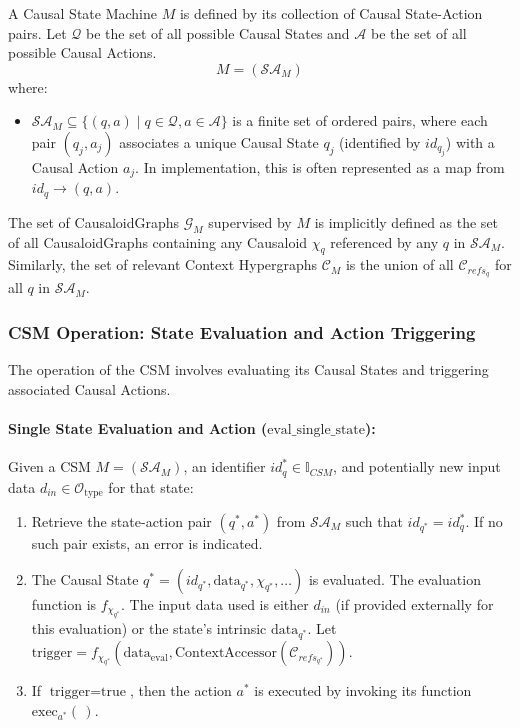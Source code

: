 \newpage

\begin{definition}
\label{def:csm_csm}  
A Causal State Machine \( M \) is defined by its collection of Causal State-Action pairs. Let \(\mathcal{Q}\) be the set of all possible Causal States and \(\mathcal{A}\) be the set of all possible Causal Actions.
\[ M = (\mathcal{SA}_M) \]
where:
\begin{itemize}
    \item \( \mathcal{SA}_M \subseteq \{(q, a) \mid q \in \mathcal{Q}, a \in \mathcal{A}\} \) is a finite set of ordered pairs, where each pair \( (q_j, a_j) \) associates a unique Causal State \(q_j\) (identified by \(id_{q_j}\)) with a Causal Action \(a_j\). In implementation, this is often represented as a map from \(id_q \to (q, a)\).
\end{itemize}
\end{definition}  

The set of CausaloidGraphs \(\mathcal{G}_M\) supervised by \(M\) is implicitly defined as the set of all CausaloidGraphs containing any Causaloid \(\chi_q\) referenced by any \(q\) in \(\mathcal{SA}_M\). Similarly, the set of relevant Context Hypergraphs \(\mathcal{C}_M\) is the union of all \(\mathcal{C}_{refs_q}\) for all \(q\) in \(\mathcal{SA}_M\).

    \subsubsection[CSM Operation: State Evaluation and Action Triggering]{CSM Operation: State Evaluation and Action Triggering}
    \label{ssec:csm_operation_formal_merged}

    The operation of the CSM involves evaluating its Causal States and triggering associated Causal Actions.

    \paragraph{Single State Evaluation and Action (\(\text{eval\_single\_state}\)):}
    Given a CSM \(M = (\mathcal{SA}_M)\), an identifier \(id_q^* \in \mathbb{I}_{CSM}\), and potentially new input data \(d_{in} \in \mathcal{O}_{\text{type}}\) for that state:
    \begin{enumerate}
        \item Retrieve the state-action pair \((q^*, a^*)\) from \(\mathcal{SA}_M\) such that \(id_{q^*} = id_q^*\). If no such pair exists, an error is indicated.
        \item The Causal State \(q^* = (id_{q^*}, \text{data}_{q^*}, \chi_{q^*}, \dots)\) is evaluated. The evaluation function is \(f_{\chi_{q^*}}\). The input data used is either \(d_{in}\) (if provided externally for this evaluation) or the state's intrinsic \(\text{data}_{q^*}\).
        Let \( \text{trigger} = f_{\chi_{q^*}}(\text{data}_{\text{eval}}, \text{ContextAccessor}(\mathcal{C}_{refs_{q^*}})) \).
        \item If \(\text{trigger} = \text{true}\), then the action \(a^*\) is executed by invoking its function \(\text{exec}_{a^*}(\,)\).
    \end{enumerate}



